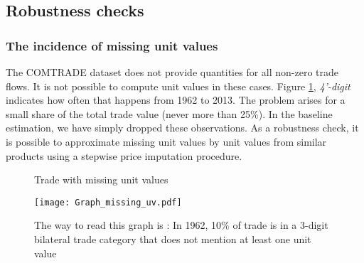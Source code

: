 \documentclass[12pt,twoside,a4paper,notitlepage]{article}
\begin{document}
\subsection{Robustness checks}
\subsubsection{ The incidence of missing unit values}
The COMTRADE dataset does not provide quantities for all non-zero trade flows.
It is not possible to compute unit values in these cases.
Figure \ref{fig:missing_uv}, \textit{4'-digit} indicates how often that happens from 1962 to 2013.
The problem arises for a small share of the total trade value (never more than 25\%).
In the baseline estimation, we have simply dropped these observations. As a robustness check, it is possible to approximate missing unit values by unit values from similar products using a stepwise price imputation procedure.


\begin{figure}[H]
	\caption{Trade with missing unit values}
	\texttt{[image: Graph\_missing\_uv.pdf]}
	\label{fig:missing_uv}
	\caption*{The way to read this graph is : In 1962, 10\% of trade is in a 3-digit bilateral trade category that does not mention at least one unit value}
\end{figure}




\end{document}
